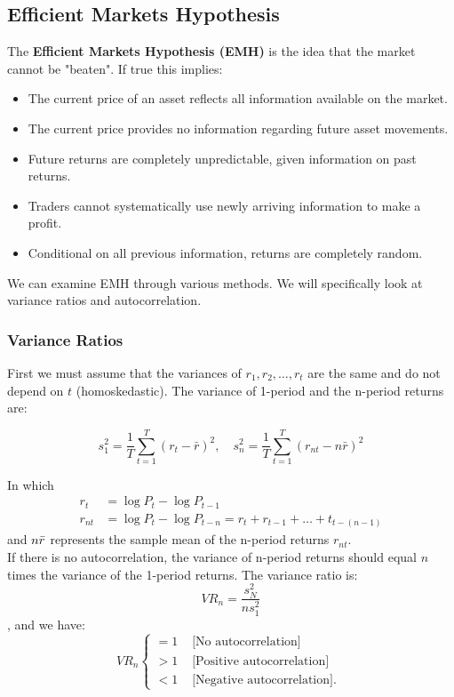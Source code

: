 \documentclass[11pt]{article}
\begin{document}
\subsection{Efficient Markets Hypothesis}
\begin{shaded}
The \textbf{Efficient Markets Hypothesis (EMH)} is the idea that the market cannot be "beaten". If true this implies:
\begin{itemize}
    \item The current price of an asset reflects all information available on the market.
    \item The current price provides no information regarding future asset movements.
    \item Future returns are completely unpredictable, given information on past returns.
    \item Traders cannot systematically use newly arriving information to make a profit.
    \item Conditional on all previous information, returns are completely random.
\end{itemize}
\end{shaded}

We can examine EMH through various methods. We will specifically look at variance ratios and autocorrelation.

\subsubsection*{Variance Ratios}

First we must assume that the variances of $r_1, r_2, \ldots, r_t$ are the same and do not depend on $t$ (homoskedastic). The variance of 1-period and the n-period returns are:

\begin{equation*}
s_1^2=\frac{1}{T} \sum_{t=1}^T\left(r_t-\bar{r}\right)^2, \quad s_n^2=\frac{1}{T} \sum_{t=1}^T\left(r_{n t}-n \bar{r}\right)^2
\end{equation*}

In which
\begin{align*}
    r_t &= \log P_t - \log P_{t-1} \\
    r_{nt} &= \log P_t - \log P_{t-n} = r_t + r_{t-1} + \ldots + t_{t-(n-1)}
\end{align*}
and $n\Bar{r}$ represents the sample mean of the n-period returns $r_{nt}$. \\

If there is no autocorrelation, the variance of n-period returns should equal $n$ times the variance of the 1-period returns. The variance ratio is:
\[VR_n = \dfrac{s_N^2}{ns_1^2}\],
and we have:
\begin{equation}
VR_n \begin{cases}=1 & \text { [No autocorrelation] } \\ >1 & \text { [Positive autocorrelation] } \\ <1 & \text { [Negative autocorrelation]. }\end{cases}
\end{equation}
\end{document}
